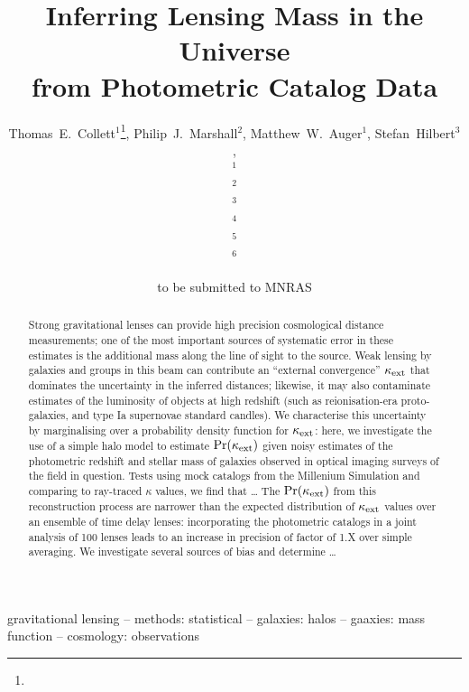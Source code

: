 \documentclass[useAMS,usenatbib]{mn2e}
\title[Line of Sight Mass Reconstruction]
{Inferring Lensing Mass in the Universe \\
from Photometric Catalog Data}
\author[Collett \etal]{%
  Thomas~E.~Collett$^{1}$\thanks{\collettemail},
  Philip~J.~Marshall$^{2}$,
  Matthew~W.~Auger$^{1}$,
  Stefan~Hilbert$^{3}$,
\newauthor{%
  Sherry~H.~Suyu$^{4}$,
  Zachary~Greene$^{4}$,
  Tommaso~Treu$^{4}$\thanks{\packard},
  Christopher~D.~Fassnacht$^{5}$,}
\newauthor{%
  L\`eon~V.~E.~Koopmans$^{6}$,
  Roger~D.~Blandford$^{3}$} 
  \medskip\\
  $^1$\ioa\\
  $^2$\oxford\\
  $^3$\kipac\\
  $^4$\ucsb\\
  $^5$\davis\\
  $^6$\kapteyn
}
\begin{document}
             
\date{to be submitted to MNRAS}
\pagerange{\pageref{firstpage}--\pageref{lastpage}}

\maketitle           

\label{firstpage}


\begin{abstract} 

Strong gravitational lenses can provide high precision cosmological distance
measurements; one of the most important sources of systematic error in these
estimates is the additional mass along the line of sight to the source. Weak
lensing by galaxies and groups in this beam can contribute an ``external
convergence'' $\kappa_{\rm ext}$ that dominates the  uncertainty in the inferred
distances; likewise, it may also contaminate estimates of the luminosity of
objects at high redshift (such as reionisation-era proto-galaxies, and type Ia
supernovae standard candles).  We characterise this uncertainty by marginalising
over a probability density function for $\kappa_{\rm ext}$: here, we investigate the use
of a simple halo model to estimate $\Pr(\kappa_{\rm ext})$ given noisy estimates of the
photometric redshift and stellar mass of galaxies observed in optical imaging
surveys of the field in question. Tests using mock catalogs from the Millenium
Simulation and comparing to ray-traced $\kappa$ values, we find that \ldots 
The $\Pr(\kappa_{\rm ext})$ from this reconstruction process are narrower than the
expected distribution of $\kappa_{\rm ext}$ values over an ensemble of time delay lenses:
incorporating the photometric catalogs in a joint analysis of 100 lenses 
leads to an increase in precision of factor of 1.X over simple averaging. We
investigate several sources of bias and determine \ldots
\end{abstract}


\begin{keywords}
  gravitational lensing   --
  methods: statistical    --
  galaxies: halos         --
  gaaxies: mass function  --
  cosmology: observations
\end{keywords}

\setcounter{footnote}{1}
\end{document}
